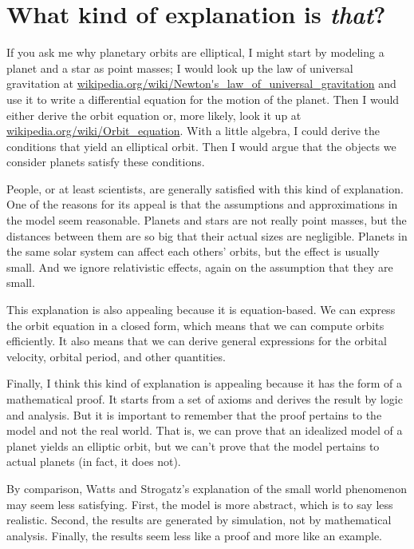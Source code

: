 \documentclass[10pt]{book}
\begin{document}
\section{What kind of explanation is {\em that}?}

If you ask me why planetary orbits are elliptical,
I might start by modeling a planet and a star as point masses; I
would look up the law of universal gravitation at
\url{wikipedia.org/wiki/Newton's_law_of_universal_gravitation}
and use it to write a differential equation for the motion of
the planet.  Then I would either derive the orbit equation or,
more likely, look it up at \url{wikipedia.org/wiki/Orbit_equation}.
With a little algebra, I could derive the conditions that
yield an elliptical orbit.  Then I would argue that the objects
we consider planets satisfy these conditions.

People, or at least scientists, are generally satisfied with
this kind of explanation.  One of the reasons for its appeal
is that the assumptions and approximations in the model seem
reasonable.  Planets and stars are not really point masses,
but the distances between them are so big that their actual
sizes are negligible.  Planets in the same solar system can
affect each others' orbits, but the effect is usually small.
And we ignore relativistic effects, again on the assumption that
they are small.

This explanation is also appealing because it is equation-based.
We can express the orbit equation in a closed form, which means
that we can compute orbits efficiently.  It also means that
we can derive general expressions for the orbital velocity,
orbital period, and other quantities.

Finally, I think this kind of explanation is appealing because
it has the form of a mathematical proof.  It starts from a
set of axioms and derives the result by logic and analysis.
But it is important to remember that the proof pertains to the
model and not the real world.  That is, we can prove that
an idealized model of a planet yields an elliptic orbit, but
we can't prove that the model pertains to actual planets (in
fact, it does not).

By comparison, Watts and Strogatz's explanation of the small
world phenomenon may seem less satisfying.  First, the model
is more abstract, which is to say less realistic.  Second,
the results are generated by simulation, not by mathematical
analysis.  Finally, the results seem less like a proof and
more like an example.
\end{document}
